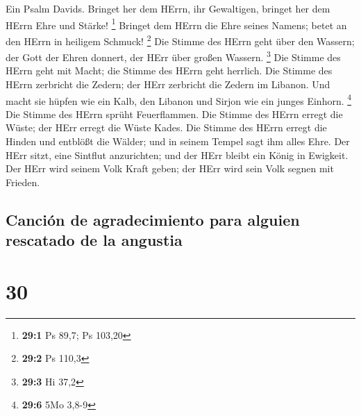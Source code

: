  Ein Psalm Davids. Bringet her dem HErrn, ihr Gewaltigen,
bringet her dem HErrn Ehre und Stärke! \footnote{\textbf{29:1} Ps 89,7;
  Ps 103,20}  Bringet dem HErrn die Ehre seines Namens;
betet an den HErrn in heiligem Schmuck! \footnote{\textbf{29:2} Ps 110,3}
 Die Stimme des HErrn geht über den Wassern; der Gott der
Ehren donnert, der HErr über großen Wassern. \footnote{\textbf{29:3} Hi
  37,2}  Die Stimme des HErrn geht mit Macht; die Stimme
des HErrn geht herrlich.  Die Stimme des HErrn zerbricht
die Zedern; der HErr zerbricht die Zedern im Libanon.  Und
macht sie hüpfen wie ein Kalb, den Libanon und Sirjon wie ein junges
Einhorn. \footnote{\textbf{29:6} 5Mo 3,8-9}  Die Stimme
des HErrn sprüht Feuerflammen.  Die Stimme des HErrn
erregt die Wüste; der HErr erregt die Wüste Kades.  Die
Stimme des HErrn erregt die Hinden und entblößt die Wälder; und in
seinem Tempel sagt ihm alles Ehre.  Der HErr sitzt, eine
Sintflut anzurichten; und der HErr bleibt ein König in Ewigkeit.
 Der HErr wird seinem Volk Kraft geben; der HErr wird
sein Volk segnen mit Frieden.

\hypertarget{canciuxf3n-de-agradecimiento-para-alguien-rescatado-de-la-angustia}{%
\subsection{Canción de agradecimiento para alguien rescatado de la
angustia}\label{canciuxf3n-de-agradecimiento-para-alguien-rescatado-de-la-angustia}}

\hypertarget{section-29}{%
\section{30}\label{section-29}}

